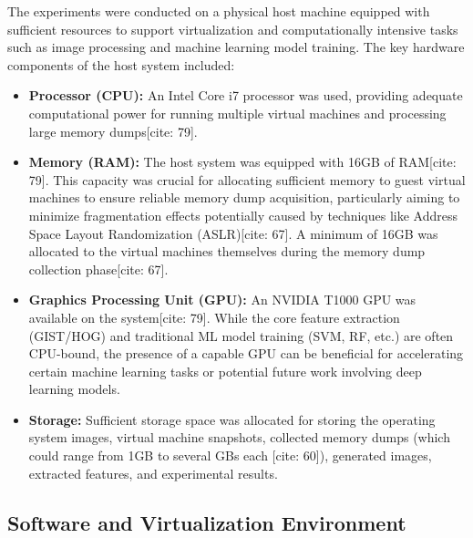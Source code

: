 The experiments were conducted on a physical host machine equipped with sufficient resources to support virtualization and computationally intensive tasks such as image processing and machine learning model training. The key hardware components of the host system included:
\begin{itemize}
    \item \textbf{Processor (CPU):} An Intel Core i7 processor was used, providing adequate computational power for running multiple virtual machines and processing large memory dumps[cite: 79].
    \item \textbf{Memory (RAM):} The host system was equipped with 16GB of RAM[cite: 79]. This capacity was crucial for allocating sufficient memory to guest virtual machines to ensure reliable memory dump acquisition, particularly aiming to minimize fragmentation effects potentially caused by techniques like Address Space Layout Randomization (ASLR)[cite: 67]. A minimum of 16GB was allocated to the virtual machines themselves during the memory dump collection phase[cite: 67].
    \item \textbf{Graphics Processing Unit (GPU):} An NVIDIA T1000 GPU was available on the system[cite: 79]. While the core feature extraction (GIST/HOG) and traditional ML model training (SVM, RF, etc.) are often CPU-bound, the presence of a capable GPU can be beneficial for accelerating certain machine learning tasks or potential future work involving deep learning models.
    \item \textbf{Storage:} Sufficient storage space was allocated for storing the operating system images, virtual machine snapshots, collected memory dumps (which could range from 1GB to several GBs each [cite: 60]), generated images, extracted features, and experimental results.
\end{itemize}

\subsection{Software and Virtualization Environment}
\label{subsec:software}

